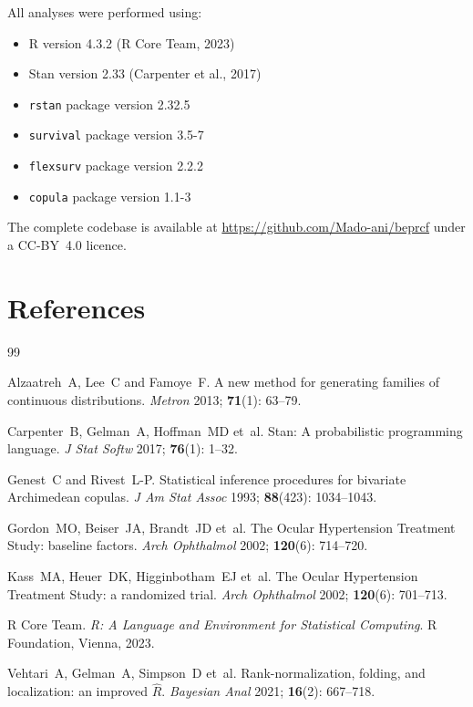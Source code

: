 \documentclass[12pt,a4paper]{article}
\begin{document}
All analyses were performed using:
\begin{itemize}
\item R version 4.3.2 (R Core Team, 2023)
\item Stan version 2.33 (Carpenter et al., 2017)
\item \texttt{rstan} package version 2.32.5
\item \texttt{survival} package version 3.5-7
\item \texttt{flexsurv} package version 2.2.2
\item \texttt{copula} package version 1.1-3
\end{itemize}

The complete codebase is available at \url{https://github.com/Mado-ani/beprcf} under a CC-BY~4.0 licence.

\section{References}

\begin{thebibliography}{99}

Alzaatreh~A, Lee~C and Famoye~F.
\newblock A new method for generating families of continuous distributions.
\newblock \textit{Metron} 2013; \textbf{71}(1): 63--79.

Carpenter~B, Gelman~A, Hoffman~MD et~al.
\newblock Stan: A probabilistic programming language.
\newblock \textit{J Stat Softw} 2017; \textbf{76}(1): 1--32.

Genest~C and Rivest~L-P.
\newblock Statistical inference procedures for bivariate Archimedean copulas.
\newblock \textit{J Am Stat Assoc} 1993; \textbf{88}(423): 1034--1043.

Gordon~MO, Beiser~JA, Brandt~JD et~al.
\newblock The Ocular Hypertension Treatment Study: baseline factors.
\newblock \textit{Arch Ophthalmol} 2002; \textbf{120}(6): 714--720.

Kass~MA, Heuer~DK, Higginbotham~EJ et~al.
\newblock The Ocular Hypertension Treatment Study: a randomized trial.
\newblock \textit{Arch Ophthalmol} 2002; \textbf{120}(6): 701--713.

R Core Team.
\newblock \textit{R: A Language and Environment for Statistical Computing}.
\newblock R Foundation, Vienna, 2023.

Vehtari~A, Gelman~A, Simpson~D et~al.
\newblock Rank-normalization, folding, and localization: an improved $\widehat{R}$.
\newblock \textit{Bayesian Anal} 2021; \textbf{16}(2): 667--718.

\end{thebibliography}
\end{document}

